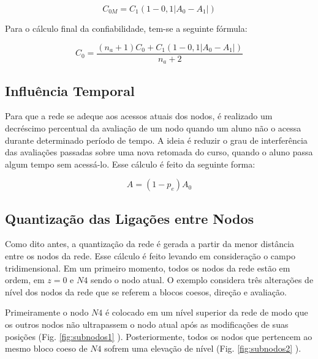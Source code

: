 \begin{equation}
	C_{0M} = C_1 (1-0,1|A_0 -  A_1 |) 
\end{equation}

Para o cálculo final da confiabilidade, tem-se a seguinte fórmula:

\begin{equation}
	C_0 = \frac{(n_a+1) C_0 + C_1 (1 - 0,1|A_0 - A_1|)}{ n_a+2 }
\end{equation}

\subsection{Influência Temporal}

Para que a rede se adeque aos acessos atuais dos nodos, é realizado um decréscimo percentual da avaliação de um nodo quando um aluno não o acessa durante determinado período de tempo. A ideia é reduzir o grau de interferência das avaliações passadas sobre uma nova retomada do curso, quando o aluno passa algum tempo sem acessá-lo. Esse cálculo é feito da seguinte forma:

\begin{equation}
	A=(1 - p_e)A_0 
\end{equation}

\subsection{Quantização das Ligações entre Nodos}

Como dito antes, a quantização da rede é gerada a partir da menor distância entre os nodos da rede. Esse cálculo é feito levando em consideração o campo tridimensional. Em um primeiro momento, todos os nodos da rede estão em ordem, em \(z=0\) e \(N4\) sendo o nodo atual. O exemplo considera três alterações de nível dos nodos da rede que se referem a blocos coesos, direção e avaliação.

Primeiramente o nodo \(N4\) é colocado em um nível superior da rede de modo que os outros nodos não ultrapassem o nodo atual após as modificações de suas posições (Fig. \ref{fig:subnodos1} ). Posteriormente, todos os nodos que pertencem ao mesmo bloco coeso de \(N4\) sofrem uma elevação de nível (Fig. \ref{fig:subnodos2} ). 


